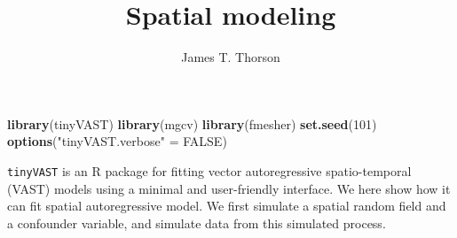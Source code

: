 \documentclass[
]{article}
\title{Spatial modeling}
\author{James T. Thorson}
\date{}
\newenvironment{Shaded}{\begin{snugshade}}{\end{snugshade}}
\newcommand{\ConstantTok}[1]{\textcolor[rgb]{0.56,0.35,0.01}{#1}}
\newcommand{\DecValTok}[1]{\textcolor[rgb]{0.00,0.00,0.81}{#1}}
\newcommand{\FunctionTok}[1]{\textcolor[rgb]{0.13,0.29,0.53}{\textbf{#1}}}
\newcommand{\NormalTok}[1]{#1}
\newcommand{\OtherTok}[1]{\textcolor[rgb]{0.56,0.35,0.01}{#1}}
\newcommand{\StringTok}[1]{\textcolor[rgb]{0.31,0.60,0.02}{#1}}
\begin{document}
\maketitle

\begin{Shaded}
\begin{Highlighting}[]
\FunctionTok{library}\NormalTok{(tinyVAST)}
\FunctionTok{library}\NormalTok{(mgcv)}
\FunctionTok{library}\NormalTok{(fmesher)}
\FunctionTok{set.seed}\NormalTok{(}\DecValTok{101}\NormalTok{)}
\FunctionTok{options}\NormalTok{(}\StringTok{"tinyVAST.verbose"} \OtherTok{=} \ConstantTok{FALSE}\NormalTok{)}
\end{Highlighting}
\end{Shaded}

\texttt{tinyVAST} is an R package for fitting vector autoregressive
spatio-temporal (VAST) models using a minimal and user-friendly
interface. We here show how it can fit spatial autoregressive model. We
first simulate a spatial random field and a confounder variable, and
simulate data from this simulated process.
\end{document}
